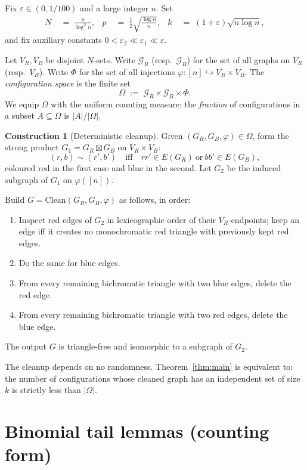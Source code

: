 \documentclass[11pt]{article}
\theoremstyle{definition}
\newtheorem{construction}[theorem]{Construction}
\newcommand{\cG}{\mathcal{G}}
\newcommand{\eps}{\varepsilon}
\begin{document}
Fix $\eps\in(0,1/100)$ and a large integer $n$.
Set
\begin{align*}
  N &\;=\; \frac{n}{\log^{2} n},
  &
  p &\;=\; \tfrac12\sqrt{\frac{\log n}{n}},
  &
  k &\;=\; (1+\eps)\sqrt{n\log n},
\end{align*}
and fix auxiliary constants $0<\eps_{2}\ll\eps_{1}\ll\eps$.

Let $V_{R},V_{B}$ be disjoint $N$-sets.
Write $\cG_{R}$ (resp.\ $\cG_{B}$) for the set of all graphs on $V_{R}$ (resp.\ $V_{B}$).
Write $\Phi$ for the set of all injections $\varphi\colon[n]\hookrightarrow V_{R}\times V_{B}$.
The \emph{configuration space} is the finite set
\[
  \Omega \;:=\; \cG_{R}\times\cG_{B}\times\Phi.
\]
We equip $\Omega$ with the uniform counting measure: the \emph{fraction} of configurations in a subset $A\subseteq\Omega$ is $|A|/|\Omega|$.

\begin{construction}[Deterministic cleanup]\label{con:cleanup}
Given $(G_{R},G_{B},\varphi)\in\Omega$, form the strong product $G_{1}=G_{R}\boxtimes G_{B}$ on $V_{R}\times V_{B}$:
\[
  (r,b)\sim(r',b')
  \quad\text{iff}\quad
  rr'\in E(G_{R})\ \text{or}\ bb'\in E(G_{B}),
\]
coloured red in the first case and blue in the second.
Let $G_{2}$ be the induced subgraph of $G_{1}$ on $\varphi([n])$.

Build $G=\mathrm{Clean}(G_{R},G_{B},\varphi)$ as follows, in order:
\begin{enumerate}
  \item Inspect red edges of $G_{2}$ in lexicographic order of their $V_{R}$-endpoints; keep an edge iff it creates no monochromatic red triangle with previously kept red edges.
  \item Do the same for blue edges.
  \item From every remaining bichromatic triangle with two blue edges, delete the red edge.
  \item From every remaining bichromatic triangle with two red edges, delete the blue edge.
\end{enumerate}
The output $G$ is triangle-free and isomorphic to a subgraph of $G_{2}$.
\end{construction}

The cleanup depends on no randomness.
Theorem~\ref{thm:main} is equivalent to: the number of configurations whose cleaned graph has an independent set of size $k$ is strictly less than $|\Omega|$.

\section{Binomial tail lemmas (counting form)}
\end{document}
